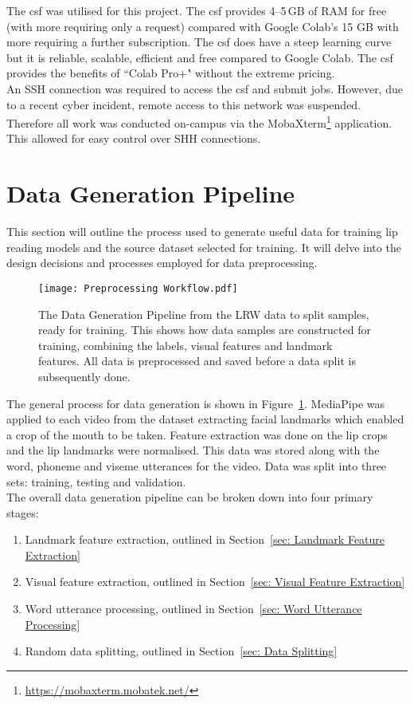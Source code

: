 The \acrshort{csf} was utilised for this project. The \acrshort{csf} provides 4--5\,GB of RAM for free (with more requiring only a request) compared with Google Colab's 15 GB with more requiring a further subscription. The \acrshort{csf} does have a steep learning curve but it is reliable, scalable, efficient and free compared to Google Colab. The \acrshort{csf} provides the benefits of ``Colab Pro+" without the extreme pricing.\\
An SSH connection was required to access the \acrshort{csf} and submit jobs. However, due to a recent cyber incident, remote access to this network was suspended. Therefore all work was conducted on-campus via the MobaXterm\footnote{\url{https://mobaxterm.mobatek.net/}} application. This allowed for easy control over SHH connections.
\section{Data Generation Pipeline}
\label{sec: Data Generation Pipeline}
This section will outline the process used to generate useful data for training lip reading models and the source dataset selected for training. It will delve into the design decisions and processes employed for data preprocessing.\\
\begin{figure}
\centering
\texttt{[image: Preprocessing Workflow.pdf]}
\caption[The Data Generation Pipeline from the LRW data to split samples, ready for training.]{The Data Generation Pipeline from the LRW data to split samples, ready for training. This shows how data samples are constructed for training, combining the labels, visual features and landmark features. All data is preprocessed and saved before a data split is subsequently done.}
\label{fig:Data Gen Pipeline}
\end{figure}
The general process for data generation is shown in Figure~\ref{fig:Data Gen Pipeline}. MediaPipe was applied to each video from the dataset extracting facial landmarks which enabled a crop of the mouth to be taken. Feature extraction was done on the lip crops and the lip landmarks were normalised. This data was stored along with the word, \gls{phoneme} and \gls{viseme} utterances for the video. Data was split into three sets: training, testing and validation.\\
The overall data generation pipeline can be broken down into four primary stages:
\begin{enumerate}
    \item Landmark feature extraction, outlined in Section~\ref{sec: Landmark Feature Extraction}
    \item Visual feature extraction, outlined in Section~\ref{sec: Visual Feature Extraction}
    \item Word utterance processing, outlined in Section~\ref{sec: Word Utterance Processing}
    \item Random data splitting, outlined in Section~\ref{sec: Data Splitting} 
\end{enumerate}
